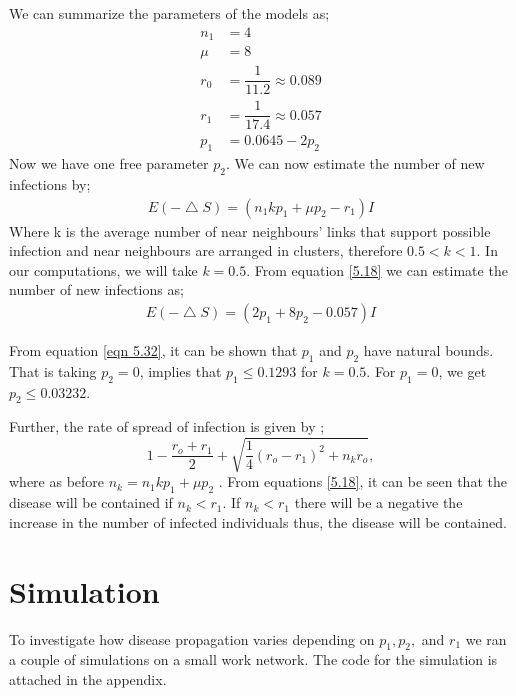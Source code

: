 We can summarize the parameters of the models as;
\begin{align}
n_1 &= 4 \\
\mu &= 8 \\
r_0 &= \dfrac{1}{11.2} \approx 0.089 \\
r_1 &= \dfrac{1}{17.4} \approx 0.057 \\
p_1 &= 0.0645 - 2 p_2 \label{eqn 5.1.7}
\end{align}
Now we have one free parameter $p_2$. We can now estimate the number of new infections by;
\begin{align}
E(- \bigtriangleup S) = (n_1 k p_1 + \mu p_2 - r_1) I \label{5.18}
\end{align}
Where k is the average number of near neighbours' links that support possible infection and near neighbours are arranged in clusters, therefore $0.5 < k <1$.
In our computations, we will take $k = 0.5$. From equation \ref{5.18} we can estimate the number of new infections as;
\begin{align}
E(- \bigtriangleup S) = (2 p_1 + 8 p_2 - 0.057) I  \label{5.1.9}
\end{align}
 
From equation \ref{eqn 5.32}, it can be shown that $p_1$ and $p_2$ have natural bounds. That is taking $p_2 = 0$, implies that $p_1 \leq 0.1293$ for $k = 0. 5$. For $p_1 = 0$, we get $p_2 \leq 0.03232$.

Further, the rate of spread of infection is given by ;
\begin{equation}
1- \dfrac{r_o + r_1}{2} + \sqrt{\dfrac{1}{4}(r_o - r_1)^2 + n_k r_o},
\end{equation}
where as before $n_k = n_1kp_1 + \mu p_2$ \citep{fu2013propagation}.
From equations \ref{5.18}, it can be seen that the disease will be contained if $n_k < r_1$. If $n_k <r_1$ there will be a negative the increase in the number of infected individuals thus, the disease will be contained.

\section{Simulation}
To investigate how disease propagation varies depending on $p_1, p_2, $ and $r_1$ we ran a couple of simulations on a small work network. The code for the simulation is attached in the appendix. 

